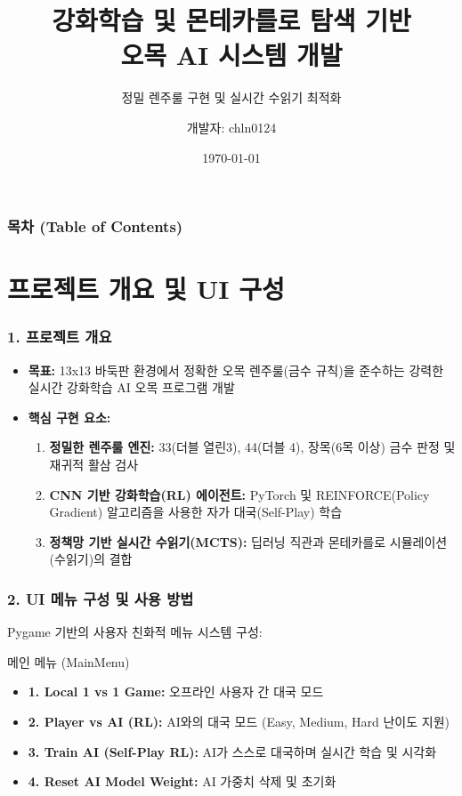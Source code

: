 \documentclass{beamer}
\title[오목 AI 시스템]{강화학습 및 몬테카를로 탐색 기반\\오목 AI 시스템 개발}
\subtitle{정밀 렌주룰 구현 및 실시간 수읽기 최적화}
\author[AntigravityPair]{개발자: chln0124}
\date{\today}
\begin{document}
\frame{\titlepage}

\begin{frame}
\frametitle{목차 (Table of Contents)}
\tableofcontents
\end{frame}

\section{프로젝트 개요 및 UI 구성}
\begin{frame}
\frametitle{1. 프로젝트 개요}
\begin{itemize}
    \item \textbf{목표:} 13x13 바둑판 환경에서 정확한 오목 렌주룰(금수 규칙)을 준수하는 강력한 실시간 강화학습 AI 오목 프로그램 개발
    \item \textbf{핵심 구현 요소:}
    \begin{enumerate}
        \item \textbf{정밀한 렌주룰 엔진:} 33(더블 열린3), 44(더블 4), 장목(6목 이상) 금수 판정 및 재귀적 활삼 검사
        \item \textbf{CNN 기반 강화학습(RL) 에이전트:} PyTorch 및 REINFORCE(Policy Gradient) 알고리즘을 사용한 자가 대국(Self-Play) 학습
        \item \textbf{정책망 기반 실시간 수읽기(MCTS):} 딥러닝 직관과 몬테카를로 시뮬레이션(수읽기)의 결합
    \end{enumerate}
\end{itemize}
\end{frame}

\begin{frame}
\frametitle{2. UI 메뉴 구성 및 사용 방법}
Pygame 기반의 사용자 친화적 메뉴 시스템 구성:
\begin{block}{메인 메뉴 (MainMenu)}
    \begin{itemize}
        \item \textbf{1. Local 1 vs 1 Game:} 오프라인 사용자 간 대국 모드
        \item \textbf{2. Player vs AI (RL):} AI와의 대국 모드 (Easy, Medium, Hard 난이도 지원)
        \item \textbf{3. Train AI (Self-Play RL):} AI가 스스로 대국하며 실시간 학습 및 시각화
        \item \textbf{4. Reset AI Model Weight:} AI 가중치 삭제 및 초기화
    \end{itemize}
\end{block}
\end{frame}
\end{document}

